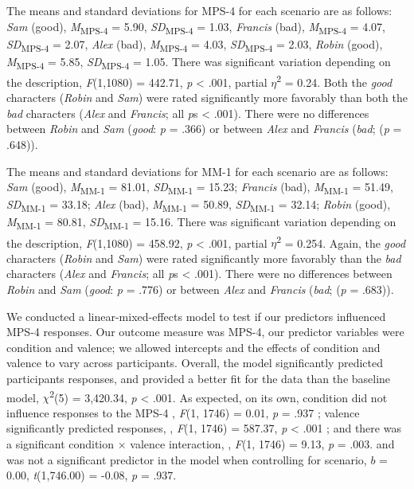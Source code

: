 \documentclass[
  english,
  man,floatsintext]{apa7}
\begin{document}
The means and standard deviations for MPS-4 for each scenario are as follows:
\emph{Sam} (good),
\emph{M}\textsubscript{MPS-4} = 5.90, \emph{SD}\textsubscript{MPS-4} = 1.03,
\emph{Francis} (bad),
\emph{M}\textsubscript{MPS-4} = 4.07, \emph{SD}\textsubscript{MPS-4} = 2.07,
\emph{Alex} (bad),
\emph{M}\textsubscript{MPS-4} = 4.03, \emph{SD}\textsubscript{MPS-4} = 2.03,
\emph{Robin} (good),
\emph{M}\textsubscript{MPS-4} = 5.85, \emph{SD}\textsubscript{MPS-4} = 1.05. There was significant variation depending on the description, \emph{F}(1,1080) = 442.71, \emph{p} \textless{} .001, partial \(\eta\)\textsuperscript{2} = 0.24. Both the \emph{good} characters (\emph{Robin} and \emph{Sam}) were rated significantly more favorably than both the \emph{bad} characters (\emph{Alex} and \emph{Francis}; all \emph{p}s \textless{} .001). There were no differences between \emph{Robin} and \emph{Sam} (\emph{good}: \emph{p} = .366) or between \emph{Alex} and \emph{Francis} (\emph{bad}; (\emph{p} = .648)).

The means and standard deviations for MM-1 for each scenario are as follows:
\emph{Sam} (good),
\emph{M}\textsubscript{MM-1} = 81.01, \emph{SD}\textsubscript{MM-1} = 15.23;
\emph{Francis} (bad),
\emph{M}\textsubscript{MM-1} = 51.49, \emph{SD}\textsubscript{MM-1} = 33.18;
\emph{Alex} (bad),
\emph{M}\textsubscript{MM-1} = 50.89, \emph{SD}\textsubscript{MM-1} = 32.14;
\emph{Robin} (good),
\emph{M}\textsubscript{MM-1} = 80.81, \emph{SD}\textsubscript{MM-1} = 15.16. There was significant variation depending on the description, \emph{F}(1,1080) = 458.92, \emph{p} \textless{} .001, partial \(\eta\)\textsuperscript{2} = 0.254. Again, the \emph{good} characters (\emph{Robin} and \emph{Sam}) were rated significantly more favorably than the \emph{bad} characters (\emph{Alex} and \emph{Francis}; all \emph{p}s \textless{} .001). There were no differences between \emph{Robin} and \emph{Sam} (\emph{good}: \emph{p} = .776) or between \emph{Alex} and \emph{Francis} (\emph{bad}; (\emph{p} = .683)).

We conducted a linear-mixed-effects model to test if our predictors influenced MPS-4 responses. Our outcome measure was MPS-4, our predictor variables were condition and valence; we allowed intercepts and the effects of condition and valence to vary across participants.
Overall, the model significantly predicted participants responses, and provided a better fit for the data than the baseline model,
\(\chi\)\textsuperscript{2}(5) = 3,420.34, \emph{p} \textless{} .001.
As expected, on its own, condition did not influence responses to the MPS-4
, \emph{F}(1, 1746) = 0.01, \emph{p} = .937
; valence significantly predicted responses,
, \emph{F}(1, 1746) = 587.37, \emph{p} \textless{} .001
; and there was a significant condition \(\times\) valence interaction,
, \emph{F}(1, 1746) = 9.13, \emph{p} = .003.
and was not a significant predictor in the model when controlling for scenario, \(b\) = 0.00, \emph{t}(1,746.00) = -0.08, \emph{p} = .937.
\end{document}
